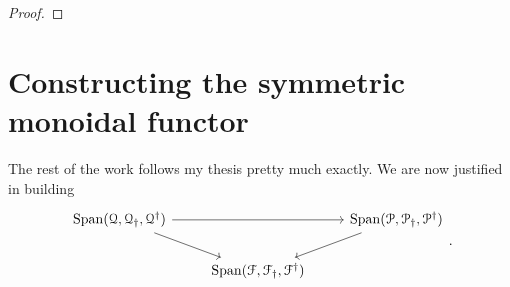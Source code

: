 \documentclass[main.tex]{subfiles}
\begin{document}
\begin{proof}


\end{proof}

\section{Constructing the symmetric monoidal functor}
\label{sec:constructing_the_symmetric_monoidal_functor}

The rest of the work follows my thesis pretty much exactly. We are now justified in building
\begin{equation*}
  \begin{tikzcd}
    \Span\triple{Q}
    \arrow[rr]
    \arrow[dr]
    && \Span\triple{P}
    \arrow[dl]
    \\
    & \Span\triple{F}
  \end{tikzcd}.
\end{equation*}
\end{document}
